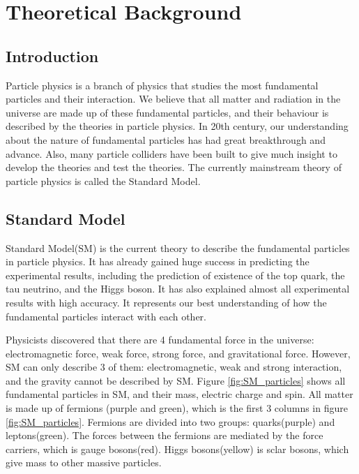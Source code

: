 \chapter{Theoretical Background}
\label{ch:theory}

\section{Introduction}
Particle physics is a branch of physics that studies the most fundamental particles and their interaction.
We believe that all matter and radiation in the universe are made up of these fundamental particles, and their behaviour is described by the theories in particle physics.
In 20th century, our understanding about the nature of fundamental particles has had great breakthrough and  advance.
Also, many particle colliders have been built to give much insight to develop the theories and test the theories.
The currently mainstream theory of particle physics is called the Standard Model.

\section{Standard Model}
\label{sec:Standard_Model}
Standard Model(SM) is the current theory to describe the fundamental particles in particle physics.
It has already gained huge success in predicting the experimental results, including the prediction of existence of the top quark, the tau neutrino, and the Higgs boson.
It has also explained almost all experimental results with high accuracy.
It represents our best understanding of how the fundamental particles interact with each other.

Physicists discovered that there are 4 fundamental force in the universe: electromagnetic force, weak force, strong force, and gravitational force.
However, SM can only describe 3 of them: electromagnetic, weak and strong interaction, and the gravity cannot be described by SM.
Figure \ref{fig:SM_particles} shows all fundamental particles in SM, and their mass, electric charge and spin.
All matter is made up of fermions (purple and green), which is the first 3 columns in figure \ref{fig:SM_particles}.
Fermions are divided into two groups: quarks(purple) and leptons(green).
The forces between the fermions are mediated by the force carriers, which is gauge bosons(red).
Higgs bosons(yellow) is sclar bosons, which give mass to other massive particles.


